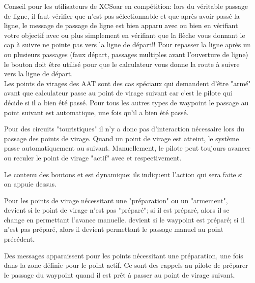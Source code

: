 \tip Conseil pour les  utilisateurs de XCSoar en compétition: lors du véritable passage de ligne, il faut vérifier que  \blink{} n'est pas sélectionnable et que après avoir passé la ligne, le message de passage de ligne est bien apparu avec \blink{} ou bien en vérifiant votre objectif avec \blink{}\blink{} ou plus simplement en vérifiant que la flèche vous donnant le cap à suivre ne pointe pas vers la ligne de départ!!
 Pour repasser la ligne après un ou plusieurs passages (faux départ, passages multiples avant l'ouverture de ligne) le bouton \blink{} doit être utilisé pour que le calculateur vous donne la route à suivre vers la ligne de départ.\\
Les points de virages des AAT sont des cas spéciaux qui demandent d'être "armé" avant que calculateur passe au point de virage suivant car c'est le pilote qui décide si il a bien été passé. Pour tous les autres types de waypoint le passage au point suivant est automatique, une fois qu'il a bien été passé.

Pour des circuits "touristiques" il n'y a donc pas d'interaction nécessaire lors du passage des points de virage. Quand un point de virage est atteint, le système passe automatiquement au suivant. Manuellement, le pilote peut toujours avancer ou reculer le point de virage "actif" avec \blink{} et \blink{} respectivement.

Le contenu des boutons   et  est dynamique: ils indiquent l'action qui sera faite si on appuie dessus.

Pour les points de virage nécessitant une "préparation" ou un "armement", \blink{}  devient  si le point de virage n'est pas "préparé"; si il est préparé, alors il se change en  permettant l'avance manuelle.   \blink{} devient   si le waypoint est préparé; si il n'est pas préparé, alors il devient  permettant le passage manuel au point précédent.

Des messages apparaissent pour les points nécessitant une préparation, une fois dans la zone définie pour le point actif. Ce sont des rappels au pilote de préparer le passage du waypoint quand il est prêt à passer au point de virage suivant. 

